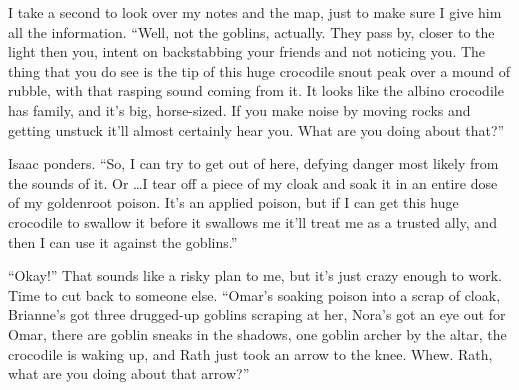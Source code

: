  I take a second to look over my notes and the map, just to make sure I give him all the information. ``Well, not the goblins, actually. They pass by, closer to the light then you, intent on backstabbing your friends and not noticing you. The thing that you do see is the tip of this huge crocodile snout peak over a mound of rubble, with that rasping sound coming from it. It looks like the albino crocodile has family, and it's big, horse-sized. If you make noise by moving rocks and getting unstuck it'll almost certainly hear you. What are you doing about that?''


 Isaac ponders. ``So, I can try to get out of here, defying danger most likely from the sounds of it. Or \ldots  I tear off a piece of my cloak and soak it in an entire dose of my goldenroot poison. It's an applied poison, but if I can get this huge crocodile to swallow it before it swallows me it'll treat me as a trusted ally, and then I can use it against the goblins.''


 ``Okay!'' That sounds like a risky plan to me, but it's just crazy enough to work. Time to cut back to someone else. ``Omar's soaking poison into a scrap of cloak, Brianne's got three drugged-up goblins scraping at her, Nora's got an eye out for Omar, there are goblin sneaks in the shadows, one goblin archer by the altar, the crocodile is waking up, and Rath just took an arrow to the knee. Whew. Rath, what are you doing about that arrow?''


